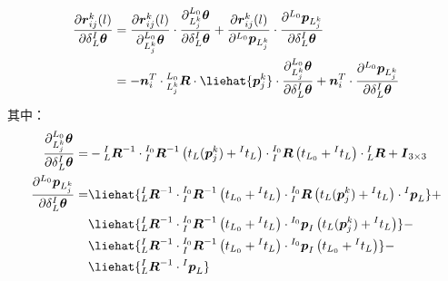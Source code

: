 \begin{equation}
  \begin{aligned}
    \label{equ:jacobian_rot_li}
    \frac{\partial \boldsymbol{r}_{ij}^k(l)}{\partial \delta {^{I}_{L}\boldsymbol{\theta}}} & =
    \frac{\partial \boldsymbol{r}_{ij}^k(l)}{\partial  {^{L_0}_{L_j^k}\boldsymbol{\theta}}}\cdot
    \frac{\partial {^{L_0}_{L_j^k}\boldsymbol{\theta}}}{\partial \delta {^{I}_{L}\boldsymbol{\theta}}}+
    \frac{\partial \boldsymbol{r}_{ij}^k(l)}{\partial {^{L_0}\boldsymbol{p}_{L_j^k}}}\cdot
    \frac{\partial {^{L_0}\boldsymbol{p}_{L_j^k}}}{\partial \delta {^{I}_{L}\boldsymbol{\theta}}} \\&=
    -\boldsymbol{n}_i^T\cdot{^{L_0}_{L_j^k}\boldsymbol{R}\cdot\liehat{\boldsymbol{p}_j^k}}
    \cdot\frac{\partial {^{L_0}_{L_j^k}\boldsymbol{\theta}}}{\partial \delta {^{I}_{L}\boldsymbol{\theta}}}
    +\boldsymbol{n}_i^T\cdot\frac{\partial {^{L_0}\boldsymbol{p}_{L_j^k}}}{\partial \delta {^{I}_{L}\boldsymbol{\theta}}}
  \end{aligned}
\end{equation}
其中：
\begin{equation}
  \begin{aligned}
    \frac{\partial {^{L_0}_{L_j^k}\boldsymbol{\theta}}}{\partial \delta {^{I}_{L}\boldsymbol{\theta}}}= &
    -{^{I}_{L}\boldsymbol{R}^{-1}}
    \cdot{{^{I_0}_{I}}\boldsymbol{R}^{-1}\left( t_{L}(\boldsymbol{p}_j^k)+{^{I}t_L}\right) }
    \cdot{{^{I_0}_{I}}\boldsymbol{R}\left( t_{L_0}+{^{I}t_L}\right) }
    \cdot{{^{I}_{L}}\boldsymbol{R}}+\boldsymbol{I}_{3\times 3}                                            \\
    \frac{\partial {^{L_0}\boldsymbol{p}_{L_j^k}}}{\partial \delta {^{I}_{L}\boldsymbol{\theta}}}=      &
    \liehat{{{^{I}_{L}}\boldsymbol{R}^{-1}}\cdot{{^{I_0}_{I}}\boldsymbol{R}^{-1}\left( t_{L_0}+{^{I}t_L}\right) }\cdot{{^{I_0}_{I}}\boldsymbol{R}\left( t_{L}(\boldsymbol{p}_j^k)+{^{I}t_L}\right) }
    \cdot{^{I}\boldsymbol{p}_L}}
    +\\&\liehat{{{^{I}_{L}}\boldsymbol{R}^{-1}}\cdot{{^{I_0}_{I}}\boldsymbol{R}^{-1}\left( t_{L_0}+{^{I}t_L}\right) }
    \cdot{^{I_0}\boldsymbol{p}_I\left( t_{L}(\boldsymbol{p}_j^k)+{^{I}t_L}\right)}}
    -\\&\liehat{{{^{I}_{L}}\boldsymbol{R}^{-1}}
      \cdot{{^{I_0}_{I}}\boldsymbol{R}^{-1}\left( t_{L_0}+{^{I}t_L}\right) }\cdot{^{I_0}\boldsymbol{p}_I\left( t_{L_0}+{^{I}t_L}\right)}}
    -\\&\liehat{{{^{I}_{L}}\boldsymbol{R}^{-1}}\cdot{^{I}\boldsymbol{p}_L}}
  \end{aligned}
\end{equation}
